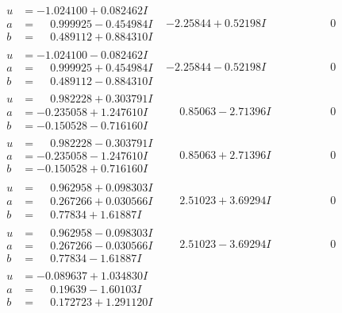 \documentclass[1p]{elsarticle_modified}
\theoremstyle{definition}
\begin{document}
$$\begin{array}{c|c|c}
\begin{aligned}
u &= -1.024100 + 0.082462 I \\
a &= \phantom{-}0.999925 - 0.454984 I \\
b &= \phantom{-}0.489112 + 0.884310 I\end{aligned}
 & -2.25844 + 0.52198 I & \phantom{-0.000000 } 0 \\ \hline\begin{aligned}
u &= -1.024100 - 0.082462 I \\
a &= \phantom{-}0.999925 + 0.454984 I \\
b &= \phantom{-}0.489112 - 0.884310 I\end{aligned}
 & -2.25844 - 0.52198 I & \phantom{-0.000000 } 0 \\ \hline\begin{aligned}
u &= \phantom{-}0.982228 + 0.303791 I \\
a &= -0.235058 + 1.247610 I \\
b &= -0.150528 - 0.716160 I\end{aligned}
 & \phantom{-}0.85063 - 2.71396 I & \phantom{-0.000000 } 0 \\ \hline\begin{aligned}
u &= \phantom{-}0.982228 - 0.303791 I \\
a &= -0.235058 - 1.247610 I \\
b &= -0.150528 + 0.716160 I\end{aligned}
 & \phantom{-}0.85063 + 2.71396 I & \phantom{-0.000000 } 0 \\ \hline\begin{aligned}
u &= \phantom{-}0.962958 + 0.098303 I \\
a &= \phantom{-}0.267266 + 0.030566 I \\
b &= \phantom{-}0.77834 + 1.61887 I\end{aligned}
 & \phantom{-}2.51023 + 3.69294 I & \phantom{-0.000000 } 0 \\ \hline\begin{aligned}
u &= \phantom{-}0.962958 - 0.098303 I \\
a &= \phantom{-}0.267266 - 0.030566 I \\
b &= \phantom{-}0.77834 - 1.61887 I\end{aligned}
 & \phantom{-}2.51023 - 3.69294 I & \phantom{-0.000000 } 0 \\ \hline\begin{aligned}
u &= -0.089637 + 1.034830 I \\
a &= \phantom{-}0.19639 - 1.60103 I \\
b &= \phantom{-}0.172723 + 1.291120 I\end{aligned}

\end{array}$$
\end{document}
